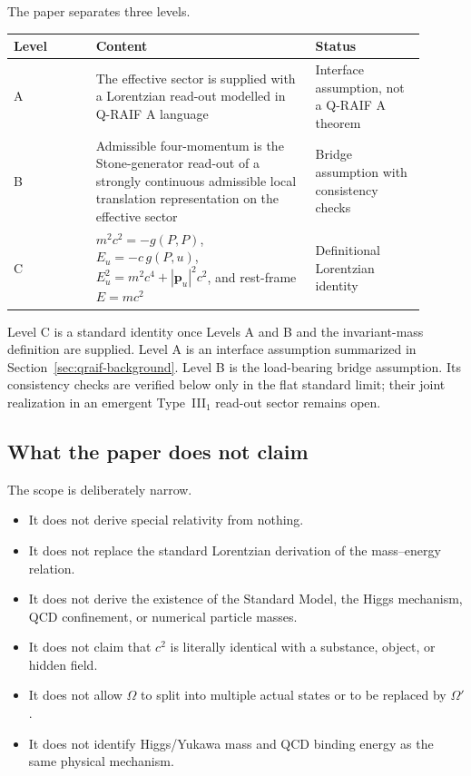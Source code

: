 \documentclass[12pt,a4paper]{article}
\theoremstyle{definition}
\theoremstyle{remark}
\newcommand{\Omegastate}{\Omega}
\newcommand{\tightlist}{%
  \setlength{\itemsep}{0pt}\setlength{\parskip}{0pt}}
\begin{document}
The paper separates three levels.

\begin{center}
\begin{tabular}{P{0.18\linewidth}P{0.48\linewidth}P{0.24\linewidth}}
\toprule
\textbf{Level} & \textbf{Content} & \textbf{Status} \\
\midrule
A & The effective sector is supplied with a Lorentzian read-out modelled in Q-RAIF A language & Interface assumption, not a Q-RAIF A theorem \\
B & Admissible four-momentum is the Stone-generator read-out of a strongly continuous admissible local translation representation on the effective sector & Bridge assumption with consistency checks \\
C & $m^2c^2=-g(P,P)$, $E_u=-c\,g(P,u)$, $E_u^2=m^2c^4+|\mathbf p_u|^2c^2$, and rest-frame $E=mc^2$ & Definitional Lorentzian identity \\
\bottomrule
\end{tabular}
\end{center}

Level C is a standard identity once Levels A and B and the invariant-mass definition are supplied. Level A is an interface assumption summarized in Section~\ref{sec:qraif-background}. Level B is the load-bearing bridge assumption. Its consistency checks are verified below only in the flat standard limit; their joint realization in an emergent Type~III$_1$ read-out sector remains open.

\subsection{What the paper does not claim}

The scope is deliberately narrow.

\begin{itemize}[leftmargin=*]
\tightlist
\item It does not derive special relativity from nothing.
\item It does not replace the standard Lorentzian derivation of the mass--energy relation.
\item It does not derive the existence of the Standard Model, the Higgs mechanism, QCD confinement, or numerical particle masses.
\item It does not claim that $c^2$ is literally identical with a substance, object, or hidden field.
\item It does not allow $\Omegastate$ to split into multiple actual states or to be replaced by $\Omegastate'$.
\item It does not identify Higgs/Yukawa mass and QCD binding energy as the same physical mechanism.
\end{itemize}
\end{document}
